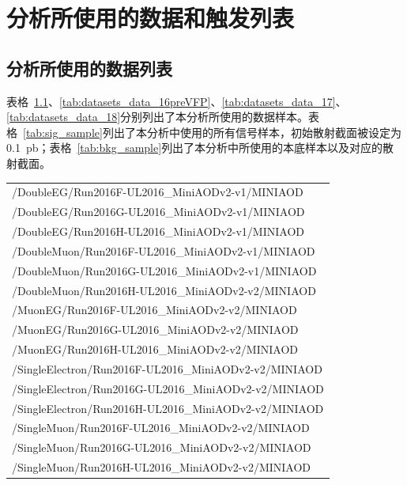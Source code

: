 
\chapter{分析所使用的数据和触发列表}\label{app:data_lists}

\section{分析所使用的数据列表}

表格~\ref{tab:datasets_data_16postVFP}、\ref{tab:datasets_data_16preVFP}、\ref{tab:datasets_data_17}、\ref{tab:datasets_data_18}分别列出了本分析所使用的数据样本。表格~\ref{tab:sig_sample}列出了本分析中使用的所有信号样本，初始散射截面被设定为0.1~\si{pb}；表格~\ref{tab:bkg_sample}列出了本分析中所使用的本底样本以及对应的散射截面。

\begin{table}[h]
\scriptsize
\centering
{}
\begin{tabular}{l}
\hline
/DoubleEG/Run2016F-UL2016\_MiniAODv2-v1/MINIAOD \\
/DoubleEG/Run2016G-UL2016\_MiniAODv2-v1/MINIAOD \\
/DoubleEG/Run2016H-UL2016\_MiniAODv2-v1/MINIAOD \\
\hline
/DoubleMuon/Run2016F-UL2016\_MiniAODv2-v1/MINIAOD \\
/DoubleMuon/Run2016G-UL2016\_MiniAODv2-v1/MINIAOD \\
/DoubleMuon/Run2016H-UL2016\_MiniAODv2-v2/MINIAOD \\
\hline
/MuonEG/Run2016F-UL2016\_MiniAODv2-v2/MINIAOD \\
/MuonEG/Run2016G-UL2016\_MiniAODv2-v2/MINIAOD \\
/MuonEG/Run2016H-UL2016\_MiniAODv2-v2/MINIAOD \\
\hline
/SingleElectron/Run2016F-UL2016\_MiniAODv2-v2/MINIAOD \\
/SingleElectron/Run2016G-UL2016\_MiniAODv2-v2/MINIAOD \\
/SingleElectron/Run2016H-UL2016\_MiniAODv2-v2/MINIAOD \\
\hline
/SingleMuon/Run2016F-UL2016\_MiniAODv2-v2/MINIAOD \\
/SingleMuon/Run2016G-UL2016\_MiniAODv2-v2/MINIAOD \\
/SingleMuon/Run2016H-UL2016\_MiniAODv2-v2/MINIAOD \\
\hline
\end{tabular}
\small
\label{tab:datasets_data_16postVFP}
\end{table}

